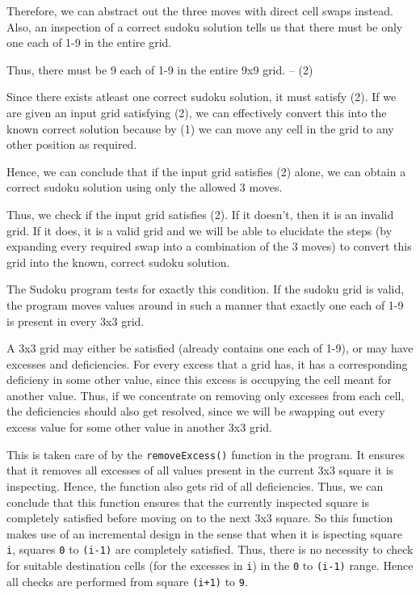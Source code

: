 \documentclass{article}
\begin{document}
Therefore, we can abstract out the three moves with direct cell swaps instead. Also, an inspection of a correct sudoku solution tells us that there must be only one each of 1-9 in the entire grid.

\bigskip
Thus, there must be 9 each of 1-9 in the entire 9x9 grid. -- (2)

\bigskip
Since there exists atleast one correct sudoku solution, it must satisfy (2). If we are given an input grid satisfying (2), we can effectively convert this into the known correct solution because by (1) we can move any cell in the grid to any other position as required.

Hence, we can conclude that if the input grid satisfies (2) alone, we can obtain a correct sudoku solution using only the allowed 3 moves.

Thus, we check if the input grid satisfies (2). If it doesn't, then it is an invalid grid. If it does, it is a valid grid and we will be able to elucidate the steps (by expanding every required swap into a combination of the 3 moves) to convert this grid into the known, correct sudoku solution.

The Sudoku program tests for exactly this condition. If the sudoku grid is valid, the program moves values around in such a manner that exactly one each of 1-9 is present in every 3x3 grid.

A 3x3 grid may either be satisfied (already contains one each of 1-9), or may have excesses and deficiencies. For every excess that a grid has, it has a corresponding deficieny in some other value, since this excess is occupying the cell meant for another value. Thus, if we concentrate on removing only excesses from each cell, the deficiencies should also get resolved, since we will be swapping out every excess value for some other value in another 3x3 grid.

This is taken care of by the \texttt{removeExcess()} function in the program. It ensures that it removes all excesses of all values present in the current 3x3 square it is inspecting. Hence, the function also gets rid of all deficiencies. Thus, we can conclude that this function ensures that the currently inspected square is completely satisfied before moving on to the next 3x3 square. So this function makes use of an incremental design in the sense that when it is ispecting square \texttt{i}, squares \texttt{0} to \texttt{(i-1)} are completely satisfied. Thus, there is no necessity to check for suitable destination cells (for the excesses in \texttt{i}) in the \texttt{0} to \texttt{(i-1)} range. Hence all checks are performed from square \texttt{(i+1)} to \texttt{9}.
\end{document}
